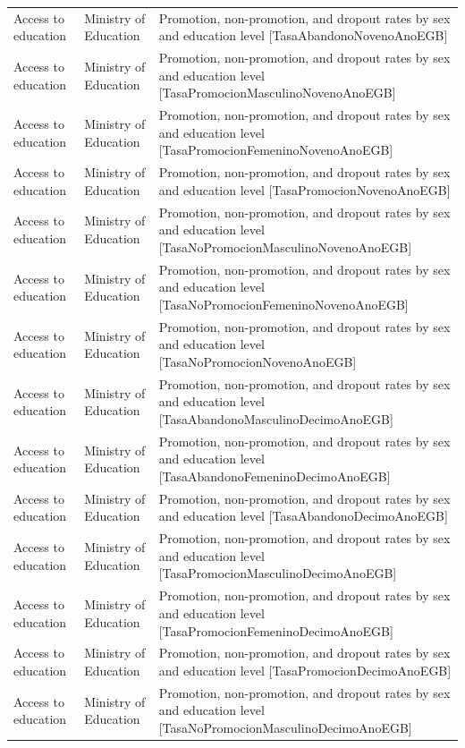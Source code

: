 \documentclass[10pt,a4paper]{article}
\begin{document}
\begin{longtable}{@{}>{\raggedright\arraybackslash}p{3.5cm}>{\raggedright\arraybackslash}p{5.6cm}>{\raggedright\arraybackslash}p{\dimexpr\textwidth-9.1cm-4\tabcolsep\relax}@{}}
Access to education & Ministry of Education & Promotion, non-promotion, and dropout rates by sex and education level [TasaAbandonoNovenoAnoEGB]\\
Access to education & Ministry of Education & Promotion, non-promotion, and dropout rates by sex and education level [TasaPromocionMasculinoNovenoAnoEGB]\\
Access to education & Ministry of Education & Promotion, non-promotion, and dropout rates by sex and education level [TasaPromocionFemeninoNovenoAnoEGB]\\
Access to education & Ministry of Education & Promotion, non-promotion, and dropout rates by sex and education level [TasaPromocionNovenoAnoEGB]\\
Access to education & Ministry of Education & Promotion, non-promotion, and dropout rates by sex and education level [TasaNoPromocionMasculinoNovenoAnoEGB]\\
Access to education & Ministry of Education & Promotion, non-promotion, and dropout rates by sex and education level [TasaNoPromocionFemeninoNovenoAnoEGB]\\
Access to education & Ministry of Education & Promotion, non-promotion, and dropout rates by sex and education level [TasaNoPromocionNovenoAnoEGB]\\
Access to education & Ministry of Education & Promotion, non-promotion, and dropout rates by sex and education level [TasaAbandonoMasculinoDecimoAnoEGB]\\
Access to education & Ministry of Education & Promotion, non-promotion, and dropout rates by sex and education level [TasaAbandonoFemeninoDecimoAnoEGB]\\
Access to education & Ministry of Education & Promotion, non-promotion, and dropout rates by sex and education level [TasaAbandonoDecimoAnoEGB]\\
Access to education & Ministry of Education & Promotion, non-promotion, and dropout rates by sex and education level [TasaPromocionMasculinoDecimoAnoEGB]\\
Access to education & Ministry of Education & Promotion, non-promotion, and dropout rates by sex and education level [TasaPromocionFemeninoDecimoAnoEGB]\\
Access to education & Ministry of Education & Promotion, non-promotion, and dropout rates by sex and education level [TasaPromocionDecimoAnoEGB]\\
Access to education & Ministry of Education & Promotion, non-promotion, and dropout rates by sex and education level [TasaNoPromocionMasculinoDecimoAnoEGB]\\

\end{longtable}
\end{document}
